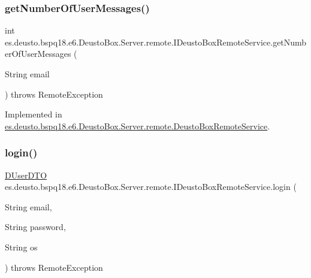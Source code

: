 \subsubsection{\texorpdfstring{get\+Number\+Of\+User\+Messages()}{getNumberOfUserMessages()}}
{\footnotesize\ttfamily int es.\+deusto.\+bspq18.\+e6.\+Deusto\+Box.\+Server.\+remote.\+I\+Deusto\+Box\+Remote\+Service.\+get\+Number\+Of\+User\+Messages (\begin{DoxyParamCaption}\item[{String}]{email }\end{DoxyParamCaption}) throws Remote\+Exception}



Implemented in \mbox{\hyperlink{classes_1_1deusto_1_1bspq18_1_1e6_1_1_deusto_box_1_1_server_1_1remote_1_1_deusto_box_remote_service_a52c001ee4b0b93a416778e4b662da841}{es.\+deusto.\+bspq18.\+e6.\+Deusto\+Box.\+Server.\+remote.\+Deusto\+Box\+Remote\+Service}}.

\mbox{\label{interfacees_1_1deusto_1_1bspq18_1_1e6_1_1_deusto_box_1_1_server_1_1remote_1_1_i_deusto_box_remote_service_a1d595efe4735a4977ec4d5d5e2f29bee}} 
\subsubsection{\texorpdfstring{login()}{login()}}
{\footnotesize\ttfamily \mbox{\hyperlink{classes_1_1deusto_1_1bspq18_1_1e6_1_1_deusto_box_1_1_server_1_1dto_1_1_d_user_d_t_o}{D\+User\+D\+TO}} es.\+deusto.\+bspq18.\+e6.\+Deusto\+Box.\+Server.\+remote.\+I\+Deusto\+Box\+Remote\+Service.\+login (\begin{DoxyParamCaption}\item[{String}]{email,  }\item[{String}]{password,  }\item[{String}]{os }\end{DoxyParamCaption}) throws Remote\+Exception}



